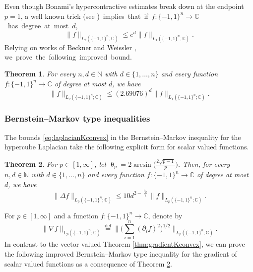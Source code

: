 \documentclass[11pt,reqno]{amsart}
\renewcommand{\leq}{\leqslant}
\renewcommand{\pi}{\uppi}
\newcommand{\1}{\mathbf 1}
\newtheorem{theorem}{Theorem}
\theoremstyle{remark}
\newcommand{\C}{\mathbb C}
\newcommand{\N}{\mathbb N}
\newcommand{\eqdef}{\stackrel{\mathrm{def}}{=}}
\renewcommand{\theta}{\uptheta}
\renewcommand{\pi}{\uppi}
\renewcommand{\pi}{\uppi}
\begin{document}
Even though Bonami's hypercontractive estimates \cite{Bon70} break down at the endpoint $p=1$, a well known trick (see \cite[Theorem~9.22]{O'D14})\mbox{ implies that if $f:\{-1,1\}^n\to \C$ has degree at most $d$,}
\begin{equation}
\|f\|_{L_2(\{-1,1\}^n;\C)} \leq e^d \|f\|_{L_1(\{-1,1\}^n;\C)}.
\end{equation}
Relying on works of Beckner \cite{Bec75} and Weissler \cite{Wei79}, we\mbox{ prove the following improved bound.}

\begin{theorem} \label{thm:momentcomp1}
For every $n,d\in\N$ with $d\in\{1,\ldots,n\}$ and every function $f:\{-1,1\}^n\to\C$ of degree at most $d$, we have
\begin{equation} \label{eq:momentcomp1}
\|f\|_{L_2(\{-1,1\}^n;\C)} \leq (2.69076)^d \|f\|_{L_1(\{-1,1\}^n;\C)}.
\end{equation}
\end{theorem}

\subsubsection{Bernstein--Markov type inequalities} The bounds \eqref{eq:laplacianKconvex} in the Bernstein--Markov inequality for the hypercube Laplacian take the following explicit form for scalar valued functions.

\begin{theorem} \label{thm:laplacianR}
For $p\in[1,\infty]$, let $\theta_p = 2\arcsin\big(\frac{2\sqrt{p-1}}{p}\big)$. Then, for every $n,d\in\N$ with $d\in\{1,\ldots,n\}$ and every function $f:\{-1,1\}^n\to\C$ of degree at most $d$, we have
\begin{equation} \label{eq:gooddomain}
\|\Delta f\|_{L_p(\{-1,1\}^n;\C)} \leq 10 d^{2-\frac{\theta_p}{\pi}} \|f\|_{L_p(\{-1,1\}^n;\C)}.
\end{equation}
\end{theorem}

For $p\in[1,\infty]$ and a function $f:\{-1,1\}^n\to\C$, denote by
\begin{equation}
\|\nabla f\|_{L_p(\{-1,1\}^n;\C)} \eqdef \Big\| \Big(\sum_{i=1}^n (\partial_i f)^2\Big)^{1/2} \Big\|_{L_p(\{-1,1\}^n;\C)}.
\end{equation}
In contrast to the vector valued Theorem \ref{thm:gradientKconvex}, we can prove the following improved Bernstein--Markov type inequality for the gradient of scalar valued functions as a consequence of Theorem \ref{thm:laplacianR}.
\end{document}
